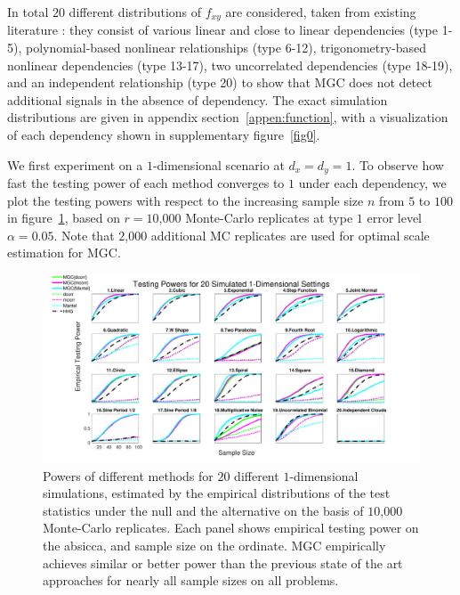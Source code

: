 \documentclass[11pt]{article}
\begin{document}
In total $20$ different distributions of $f_{xy}$ are considered, taken from existing literature \cite{SzekelyRizzoBakirov2007, SimonTibshirani2012, GorfineHellerHeller2012, HellerGorfine2013}: they consist of various linear and close to linear dependencies (type 1-5), polynomial-based nonlinear relationships (type 6-12), trigonometry-based nonlinear dependencies (type 13-17), two uncorrelated dependencies (type 18-19), and an independent relationship (type 20) to show that MGC does not detect additional signals in the absence of dependency. The exact simulation distributions are given in appendix section~\ref{appen:function}, with a visualization of each dependency shown in supplementary figure~\ref{fig0}.

We first experiment on a $1$-dimensional scenario at $d_{x}=d_{y}=1$. To observe how fast the testing power of each method converges to $1$ under each dependency, we plot the testing powers with respect to the increasing sample size $n$ from $5$ to $100$ in figure~\ref{fig:1D}, based on $r=10$,$000$ Monte-Carlo replicates at type $1$ error level $\alpha=0.05$. Note that $2$,$000$ additional MC replicates are used for optimal scale estimation for MGC. %

\begin{figure}[htbp]
\includegraphics[width=1.0\textwidth]{Figures/Fig1}
\caption{
Powers of different methods for $20$ different $1$-dimensional simulations, estimated by the empirical distributions of the test statistics under the null and the alternative on the basis of $10$,$000$ Monte-Carlo replicates.
Each panel shows empirical testing power on the absicca, and sample size on the ordinate.
MGC empirically achieves similar or better power than the previous state of the art approaches for nearly all sample sizes on all problems.}
\label{fig:1D}
\end{figure}
\end{document}
